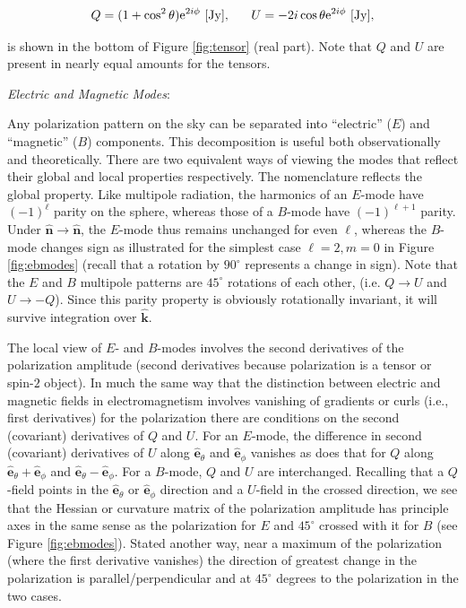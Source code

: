 \documentclass[a4paper,11pt]{article}
\begin{document}
\begin{align*}
    Q=(1+\cos^2\theta)\mathrm{e}^{2i\phi}~[{\rm Jy}], ~~~~~U=-2i\cos\theta\mathrm{e}^{2i\phi}~[{\rm Jy}],
\end{align*}

{\noindent}is shown in the bottom of Figure \ref{fig:tensor} (real part). Note that $Q$ and $U$ are present in nearly equal amounts for the tensors.

{\noindent}\textit{Electric and Magnetic Modes}:

{\noindent}Any polarization pattern on the sky can be separated into ``electric'' ($E$) and ``magnetic'' ($B$) components. This decomposition is useful both observationally and theoretically. There are two equivalent ways of viewing the modes that reflect their global and local properties respectively. The nomenclature reflects the global property. Like multipole radiation, the harmonics of an $E$-mode have $(-1)^\ell$ parity on the sphere, whereas those of a $B$-mode have $(-1)^{\ell+1}$ parity. Under $\bm{\hat{n}}\rightarrow\bm{\hat{n}}$, the $E$-mode thus remains unchanged for even $\ell$, whereas the $B$-mode changes sign as illustrated for the simplest case $\ell=2,m=0$ in Figure \ref{fig:ebmodes} (recall that a rotation by $90^\circ$ represents a change in sign). Note that the $E$ and $B$ multipole patterns are $45^\circ$ rotations of each other, (i.e. $Q\rightarrow U$ and $U\rightarrow-Q$). Since this parity property is obviously rotationally invariant, it will survive integration over $\bm{\hat{k}}$.

{\noindent}The local view of $E$- and $B$-modes involves the second derivatives of the polarization amplitude (second derivatives because polarization is a tensor or spin-$2$ object). In much the same way that the distinction between electric and magnetic fields in electromagnetism involves vanishing of gradients or curls (i.e., first derivatives) for the polarization there are conditions on the second (covariant) derivatives of $Q$ and $U$. For an $E$-mode, the difference in second (covariant) derivatives of $U$ along $\bm{\hat{e}}_\theta$ and $\bm{\hat{e}}_\phi$ vanishes as does that for $Q$ along $\bm{\hat{e}}_\theta+\bm{\hat{e}}_\phi$ and $\bm{\hat{e}}_\theta-\bm{\hat{e}}_\phi$. For a $B$-mode, $Q$ and $U$ are interchanged. Recalling that a $Q$-field points in the $\bm{\hat{e}}_\theta$ or $\bm{\hat{e}}_\phi$ direction and a $U$-field in the crossed direction, we see that the Hessian or curvature matrix of the polarization amplitude has principle axes in the same sense as the polarization for $E$ and $45^\circ$ crossed with it for $B$ (see Figure \ref{fig:ebmodes}). Stated another way, near a maximum of the polarization (where the first derivative vanishes) the direction of greatest change in the polarization is parallel/perpendicular and at $45^\circ$ degrees to the polarization in the two cases.
\end{document}
